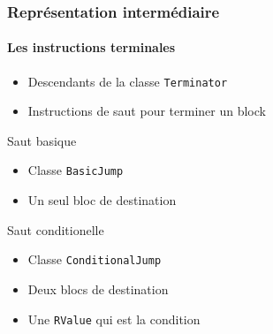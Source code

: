 \documentclass{beamer}
\begin{document}
\begin{frame}
    \frametitle{Représentation intermédiaire}
    \framesubtitle{Les instructions terminales}
    \begin{itemize}
        \item Descendants de la classe \lstinline{Terminator}
        \item Instructions de saut pour terminer un block
    \end{itemize}
    \pause
    \begin{block}{Saut basique}
        \begin{itemize}
            \item Classe \lstinline{BasicJump}
            \item Un seul bloc de destination
        \end{itemize}
    \end{block}
    \pause
    \begin{block}{Saut conditionelle}
        \begin{itemize}
            \item Classe \lstinline{ConditionalJump}
            \item Deux blocs de destination
            \item Une \lstinline{RValue} qui est la condition
        \end{itemize}
    \end{block}
\end{frame}
\end{document}
